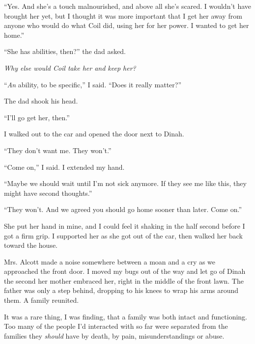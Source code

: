``Yes.  And she's a touch malnourished, and above all she's scared.  I wouldn't have brought her yet, but I thought it was more important that I get her away from anyone who would do what Coil did, using her for her power.  I wanted to get her home.''



``She has abilities, then?'' the dad asked.



\emph{Why else would Coil take her and keep her?}



``\emph{An} ability, to be specific,'' I said.  ``Does it really matter?''



The dad shook his head.



``I'll go get her, then.''



I walked out to the car and opened the door next to Dinah.



``They don't want me.  They won't.''



``Come on,'' I said.  I extended my hand.



``Maybe we should wait until I'm not sick anymore.  If they see me like this, they might have second thoughts.''



``They won't.  And we agreed you should go home sooner than later.  Come on.''



She put her hand in mine, and I could feel it shaking in the half second before I got a firm grip.  I supported her as she got out of the car, then walked her back toward the house.



Mrs. Alcott made a noise somewhere between a moan and a cry as we approached the front door.  I moved my bugs out of the way and let go of Dinah the second her mother embraced her, right in the middle of the front lawn.  The father was only a step behind, dropping to his knees to wrap his arms around them.  A family reunited.



It was a rare thing, I was finding, that a family was both intact and functioning.  Too many of the people I'd interacted with so far were separated from the families they \emph{should} have by death, by pain, misunderstandings or abuse.



